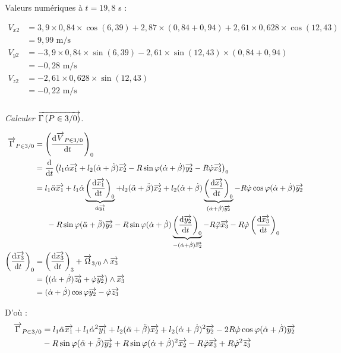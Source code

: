 \documentclass[10pt,fleqn]{article} %
\begin{document}
\begin{multicols}{2}
\begin{corrige}
Valeurs numériques à $t=19,8$ s :

\begin{align*}
V_{x2}&=3,9\times 0,84 \times \cos (6,39) + 2,87  \times (0,84 + 0,94) + 2,61 \times 0,628 \times \cos (12,43) \\
	&=\boxed{9,99\text{ m/s}}\\
V_{y2}&=-3,9 \times 0,84 \times \sin(6,39) - 2,61 \times \sin(12,43) \times (0,84 + 0,94)\\
	&=\boxed{-0,28\text{ m/s}}\\
V_{z2}&=-2,61\times 0,628 \times \sin(12,43) \\
	&=\boxed{-0,22 \text{ m/s}}
\end{align*}

\end{corrige}\else\fi

\subparagraph{}
\textit{Calculer $\overrightarrow{\Gamma\left(P\in3/0 \right)}$.}
\ifprof
\begin{corrige}

\begin{align*}
\overrightarrow{\Gamma}_{P \in 3 / 0}&=\left( \dfrac{\mathrm{d} \overrightarrow{V}_{P\in 3 / 0}}{\mathrm{d} t} \right)_{0}\\
	&=\dfrac{\mathrm{d}}{\mathrm{d} t}\left( l_1\dot\alpha\overrightarrow{x_{1}}+l_2(\dot\alpha+\dot\beta)\overrightarrow{x_2}-R\sin\varphi(\dot\alpha+\dot\beta)\overrightarrow{y_2}-R\dot\varphi\overrightarrow{x_3} \right)_0 \\
	&=l_1 \ddot\alpha\overrightarrow{x_{1}}+l_1 \dot\alpha\underbrace{\left( \frac{\mathrm{d} \overrightarrow{x_{1}}}{\mathrm{d} t} \right)_{0}}_{\dot\alpha\overrightarrow{y_{1}}} + l_2(\ddot\alpha + \ddot\beta)\overrightarrow{x_2}+ l_2(\dot\alpha+\dot\beta)\underbrace{\left( \frac{\mathrm{d} \overrightarrow{x_2}}{\mathrm{d} t} \right)_{0}}_{(\dot\alpha+\dot\beta)\overrightarrow{y_2}}-R\dot\varphi\cos\varphi(\dot\alpha+\dot\beta)\overrightarrow{y_2}\\
	&\phantom{==}-R\sin\varphi(\ddot\alpha+\ddot\beta)\overrightarrow{y_2}-R\sin\varphi(\dot\alpha+\dot\beta)\underbrace{\left( \frac{\mathrm{d} \overrightarrow{y_2}}{\mathrm{d} t} \right)_{0}}_{-(\dot\alpha+\dot\beta)\overrightarrow{x_2}}-R\ddot\varphi\overrightarrow{x_3} -R\dot\varphi\left( \frac{\mathrm{d} \overrightarrow{x_3}}{\mathrm{d} t} \right)_{0}\\
\left( \frac{\mathrm{d} \overrightarrow{x_3}}{\mathrm{d} t} \right)_{0}&={\left( \frac{\mathrm{d} \overrightarrow{x_3}}{\mathrm{d} t} \right)_{3}}+\overrightarrow{\Omega}_{3 / 0}\wedge\overrightarrow{x_3}\\
		&=\left((\dot\alpha+\dot\beta)\overrightarrow{z_0}+\dot\varphi\overrightarrow{y_2}\right)\wedge\overrightarrow{x_3}\\
		&=(\dot\alpha+\dot\beta)\cos\varphi\overrightarrow{y_2}-\dot\varphi\overrightarrow{z_3}
		\end{align*}
		
D'où :
\begin{align*}
\overrightarrow{\Gamma}_{P \in 3 / 0}&=l_1 \ddot\alpha\overrightarrow{x_{1}}+l_1 \dot\alpha^2\overrightarrow{y_{1}} + l_2(\ddot\alpha + \ddot\beta)\overrightarrow{x_2}+ l_2(\dot\alpha+\dot\beta)^2\overrightarrow{y_2}-2R\dot\varphi\cos\varphi(\dot\alpha+\dot\beta)\overrightarrow{y_2}\\
	& -R\sin\varphi(\ddot\alpha+\ddot\beta)\overrightarrow{y_2}+R\sin\varphi(\dot\alpha+\dot\beta)^2\overrightarrow{x_2}-R\ddot\varphi\overrightarrow{x_3} +R\dot\varphi^2\overrightarrow{z_3}
\end{align*}



\end{corrige}
\end{multicols}
\end{document}
